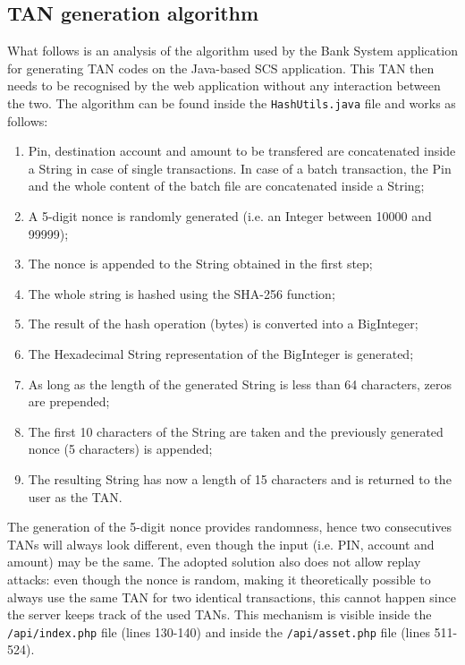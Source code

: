 \subsection{TAN generation algorithm}
What follows is an analysis of the algorithm used by the Bank System application for generating TAN codes on the Java-based SCS application. This TAN then needs to be recognised by the web application without any interaction between the two.\newline
The algorithm can be found inside the \texttt{HashUtils.java} file and works as follows:
\begin{enumerate}
	\item Pin, destination account and amount to be transfered are concatenated inside a String in case of single transactions. In case of a batch transaction, the Pin and the whole content of the batch file are concatenated inside a String;
	\item A 5-digit nonce is randomly generated (i.e. an Integer between 10000 and 99999);
	\item The nonce is appended to the String obtained in the first step;
	\item The whole string is hashed using the SHA-256 function;
	\item The result of the hash operation (bytes) is converted into a BigInteger;
	\item The Hexadecimal String representation of the BigInteger is generated;
	\item As long as the length of the generated String is less than 64 characters, zeros are prepended;
	\item The first 10 characters of the String are taken and the previously generated nonce (5 characters) is appended;
	\item The resulting String has now a length of 15 characters and is returned to the user as the TAN.
\end{enumerate}
The generation of the 5-digit nonce provides randomness, hence two consecutives TANs will always look different, even though the input (i.e. PIN, account and amount) may be the same. The adopted solution also does not allow replay attacks: even though the nonce is random, making it theoretically possible to always use the same TAN for two identical transactions, this cannot happen since the server keeps track of the used TANs. This mechanism is visible inside the \texttt{/api/index.php} file (lines 130-140) and inside the \texttt{/api/asset.php} file (lines 511-524).\newline
